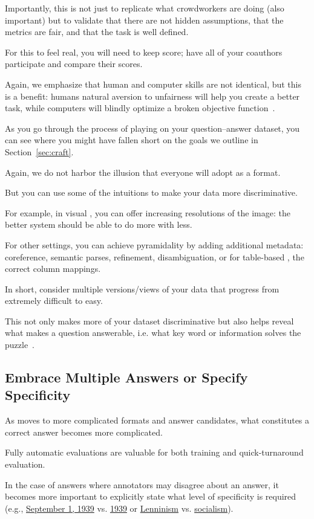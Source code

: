 Importantly, this is not just to replicate what crowdworkers are doing (also important) but to validate that there are not hidden assumptions, that the metrics are fair, and that the task is well defined.

For this to feel real, you will need to keep score; have all of your coauthors participate and compare their scores.

Again, we emphasize that human and computer skills are not identical, but this is a benefit: humans natural aversion to unfairness will help you create a better task, while computers will blindly optimize a broken objective function~\cite{bostrom-03}.

As you go through the process of playing on your question--answer dataset, you can see where you might have fallen short on the goals we outline in Section~\ref{sec:craft}.

Again, we do not harbor the illusion that everyone will adopt \qb{} as a format.

But you can use some of the intuitions to make your data more discriminative.

For example, in visual , you can offer increasing resolutions of the image: the better system should be able to do more with less.

For other settings, you can achieve pyramidality by adding additional metadata: coreference, semantic parses, refinement, disambiguation, or for table-based , the correct column mappings.

In short, consider multiple versions/views of your data that progress from extremely difficult to easy.

This not only makes more of your dataset discriminative but also helps reveal what makes a question answerable, i.e. what key word or information solves the puzzle~\cite[Chapter 10]{klagge-10}.

\subsection{Embrace Multiple Answers or Specify Specificity}

As \qa{} moves to more complicated formats and answer candidates, what constitutes a correct answer becomes more complicated.

Fully automatic evaluations are valuable for both training and quick-turnaround evaluation.

In the case of answers where annotators may disagree about an answer, it becomes more important to explicitly state what level of specificity is required (e.g., \underline{September 1, 1939} vs. \underline{1939} or \underline{Lenninism} vs. \underline{socialism}).

